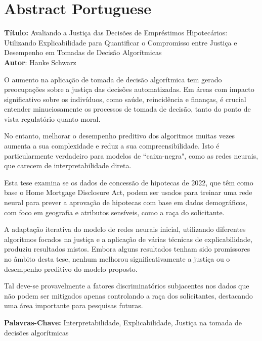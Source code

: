 \chapter*{Abstract Portuguese}\label{abstractp}

\noindent
\textbf{Título:} Avaliando a Justiça das Decisões de Empréstimos Hipotecários: \\
Utilizando Explicabilidade para Quantificar o Compromisso entre Justiça e Desempenho em Tomadas de Decisão Algorítmicas\\
\textbf{Autor}: Hauke Schwarz
\vspace{1em}

O aumento na aplicação de tomada de decisão algorítmica tem gerado preocupações sobre a justiça das decisões automatizadas. Em áreas com impacto significativo sobre os indivíduos, como saúde, reincidência e finanças, é crucial entender minuciosamente os processos de tomada de decisão, tanto do ponto de vista regulatório quanto moral.

No entanto, melhorar o desempenho preditivo dos algoritmos muitas vezes aumenta a sua complexidade e reduz a sua compreensibilidade. Isto é particularmente verdadeiro para modelos de “caixa-negra", como as redes neurais, que carecem de interpretabilidade direta.

Esta tese examina se os dados de concessão de hipotecas de 2022, que têm como base o Home Mortgage Disclosure Act, podem ser usados para treinar uma rede neural para prever a aprovação de hipotecas com base em dados demográficos, com foco em geografia e atributos sensíveis, como a raça do solicitante.

A adaptação iterativa do modelo de redes neurais inicial, utilizando diferentes algoritmos focados na justiça e a aplicação de várias técnicas de explicabilidade, produziu resultados mistos. Embora alguns resultados tenham sido promissores no âmbito desta tese, nenhum melhorou significativamente a justiça ou o desempenho preditivo do modelo proposto.

Tal deve-se provavelmente a fatores discriminatórios subjacentes nos dados que não podem ser mitigados apenas controlando a raça dos solicitantes, destacando uma área importante para pesquisas futuras.

\vspace{3em}

\textbf{Palavras-Chave:} Interpretabilidade, Explicabilidade, Justiça na tomada de decisões algorítmicas \\